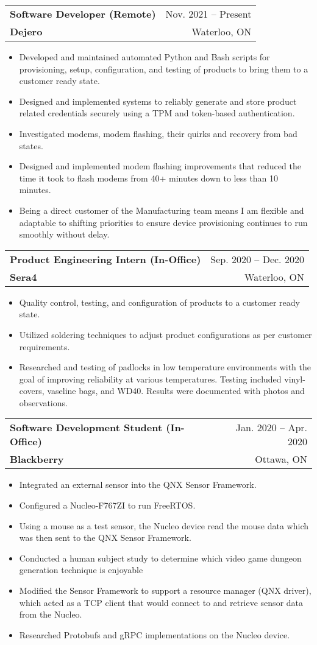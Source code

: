 \documentclass[letterpaper,11pt]{article}
\makeatletter
\newcommand{\resumeItem}[1]{
  \item[\color{Brown}{\textbullet}]\small{
    {#1 \vspace{-2pt}}
  }
}
\newcommand{\resumeSubheading}[4]{
  \vspace{-2pt}\item
    \begin{tabular*}{0.97\textwidth}[t]{l@{\extracolsep{\fill}}r}
      \textbf{#1} & #2 \\
      \textbf{\small#3} & \small #4 \\
    \end{tabular*}\vspace{-7pt}
}
\newcommand{\resumeItemListStart}{\begin{itemize}}
\newcommand{\resumeItemListEnd}{\end{itemize}\vspace{-5pt}}
\makeatother
\begin{document}
    \resumeSubheading
      {Software Developer (Remote)}{Nov. 2021 -- Present}
      {Dejero}{Waterloo, ON}
      \resumeItemListStart
        \resumeItem{Developed and maintained automated Python and Bash scripts for provisioning, setup, configuration, and testing of products to bring them to a customer ready state.}
        \resumeItem{Designed and implemented systems to reliably generate and store product related credentials securely using a TPM and token-based authentication.}
        \resumeItem{Investigated modems, modem flashing, their quirks and recovery from bad states.}
        \resumeItem{Designed and implemented modem flashing improvements that reduced the time it took to flash modems from 40+ minutes down to less than 10 minutes.}
        \resumeItem{Being a direct customer of the Manufacturing team means I am flexible and adaptable to shifting priorities to ensure device provisioning continues to run smoothly without delay.}
      \resumeItemListEnd

    \resumeSubheading
      {Product Engineering Intern (In-Office)}{Sep. 2020 -- Dec. 2020}
      {Sera4}{Waterloo, ON}
      \resumeItemListStart
        \resumeItem{Quality control, testing, and configuration of products to a customer ready state.}
        \resumeItem{Utilized soldering techniques to adjust product configurations as per customer requirements.}
        \resumeItem{Researched and testing of padlocks in low temperature environments with the goal of improving reliability at various temperatures. Testing included vinyl-covers, vaseline bags, and WD40. Results were documented with photos and observations.}
    \resumeItemListEnd

    \resumeSubheading
      {Software Development Student (In-Office)}{Jan. 2020 -- Apr. 2020}
      {Blackberry}{Ottawa, ON}
      \resumeItemListStart
        \resumeItem{Integrated an external sensor into the QNX Sensor Framework.}
        \resumeItem{Configured a Nucleo-F767ZI to run FreeRTOS.}
        \resumeItem{Using a mouse as a test sensor, the Nucleo device read the mouse data which was then sent to the QNX Sensor Framework.}
        \resumeItem{Conducted  a human subject study to determine which video game dungeon generation technique is enjoyable}
        \resumeItem{Modified the Sensor Framework to support a resource manager (QNX driver), which acted as a TCP client that would connect to and retrieve sensor data from the Nucleo.}
        \resumeItem{Researched Protobufs and gRPC implementations on the Nucleo device.}
      \resumeItemListEnd
\end{document}

